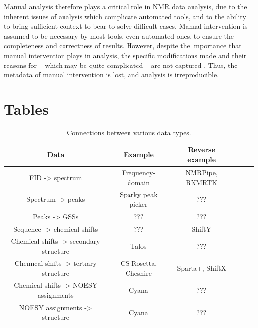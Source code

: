 Manual analysis therefore plays a critical role in NMR data analysis, due 
to the inherent issues of analysis which complicate automated tools, and 
to the ability to bring sufficient context to bear to solve difficult cases.  
Manual intervention is assumed to be necessary by 
most tools, even automated ones, to ensure the completeness and correctness 
of results.  However, despite the importance that manual intervention plays 
in analysis, the specific modifications made and their reasons for -- 
which may be quite complicated -- are not captured \cite{guntert2009automated}.  
Thus, the metadata of manual intervention is lost, and analysis is 
irreproducible.


\clearpage
\section{Tables}

\begin{table}[h]
    \begin{tabular}{ | c || c | c | c | c | c |}
    \hline
      Data                                      &  Example              &  Reverse example      \\  \hline
      FID -> spectrum                           &  Frequency-domain     &  NMRPipe, RNMRTK      \\  \hline
      Spectrum -> peaks                         &  Sparky peak picker   &  ???                  \\  \hline
      Peaks -> GSSs                             &  ???                  &  ???                  \\  \hline
      Sequence -> chemical shifts               &  ???                  &  ShiftY               \\  \hline
      Chemical shifts -> secondary structure    &  Talos                &  ???                  \\  \hline
      Chemical shifts -> tertiary structure     &  CS-Rosetta, Cheshire &  Sparta+, ShiftX      \\  \hline
      Chemical shifts -> NOESY assignments      &  Cyana                &  ???                  \\  \hline
      NOESY assignments -> structure            &  Cyana                &  ???                  \\  \hline
    \hline 
    \end{tabular}
    \caption{Connections between various data types.}
    \label{data_connections}
\end{table}



